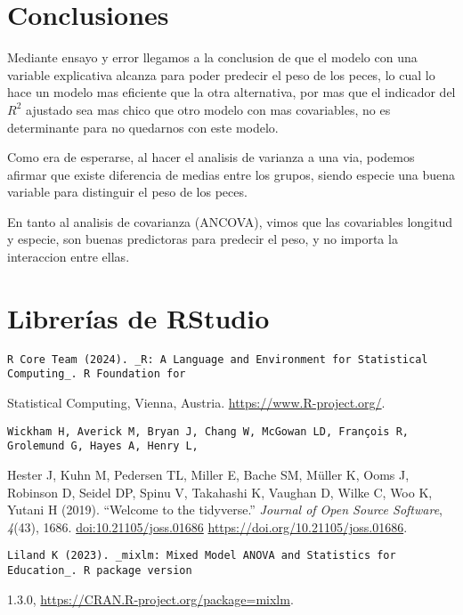 \documentclass[
]{article}
\begin{document}
\section{Conclusiones}\label{conclusiones}

Mediante ensayo y error llegamos a la conclusion de que el modelo con
una variable explicativa alcanza para poder predecir el peso de los
peces, lo cual lo hace un modelo mas eficiente que la otra alternativa,
por mas que el indicador del \(R^2\) ajustado sea mas chico que otro
modelo con mas covariables, no es determinante para no quedarnos con
este modelo.

Como era de esperarse, al hacer el analisis de varianza a una via,
podemos afirmar que existe diferencia de medias entre los grupos, siendo
especie una buena variable para distinguir el peso de los peces.

En tanto al analisis de covarianza (ANCOVA), vimos que las covariables
longitud y especie, son buenas predictoras para predecir el peso, y no
importa la interaccion entre ellas.

\section{Librerías de RStudio}\label{libreruxedas-de-rstudio}

\begin{verbatim}
R Core Team (2024). _R: A Language and Environment for Statistical Computing_. R Foundation for
\end{verbatim}

Statistical Computing, Vienna, Austria.
\url{https://www.R-project.org/}.

\begin{verbatim}
Wickham H, Averick M, Bryan J, Chang W, McGowan LD, François R, Grolemund G, Hayes A, Henry L,
\end{verbatim}

Hester J, Kuhn M, Pedersen TL, Miller E, Bache SM, Müller K, Ooms J,
Robinson D, Seidel DP, Spinu V, Takahashi K, Vaughan D, Wilke C, Woo K,
Yutani H (2019). ``Welcome to the tidyverse.'' \emph{Journal of Open
Source Software}, \emph{4}(43), 1686. \url{doi:10.21105/joss.01686}
\url{https://doi.org/10.21105/joss.01686}.

\begin{verbatim}
Liland K (2023). _mixlm: Mixed Model ANOVA and Statistics for Education_. R package version
\end{verbatim}

1.3.0, \url{https://CRAN.R-project.org/package=mixlm}.
\end{document}
